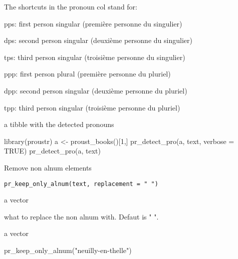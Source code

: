 \documentclass[a4paper]{book}
\begin{document}
%
\begin{Details}\relax
The shortcuts in the pronoun col stand for: 

pps: first person singular (première personne du singulier)

dps: second person singular (deuxième personne du singulier)

tps: third person singular (troisième personne du singulier)

ppp: first person plural (première personne du pluriel)

dpp: second person singular (deuxième personne du pluriel)

tpp: third person singular (troisième personne du pluriel)
\end{Details}
%
\begin{Value}
a tibble with the detected pronouns
\end{Value}
%
\begin{Examples}
\begin{ExampleCode}
library(proustr)
a <- proust_books()[1,] 
pr_detect_pro(a, text, verbose = TRUE)
pr_detect_pro(a, text)
\end{ExampleCode}
\end{Examples}
%
\begin{Description}\relax
Remove non alnum elements
\end{Description}
%
\begin{Usage}
\begin{verbatim}
pr_keep_only_alnum(text, replacement = " ")
\end{verbatim}
\end{Usage}
%
\begin{Arguments}
\begin{ldescription}
\item[\code{text}] a vector

\item[\code{replacement}] what to replace the non alnum with. Defaut is " ".
\end{ldescription}
\end{Arguments}
%
\begin{Value}
a vector
\end{Value}
%
\begin{Examples}
\begin{ExampleCode}
pr_keep_only_alnum("neuilly-en-thelle")
\end{ExampleCode}
\end{Examples}
\end{document}
